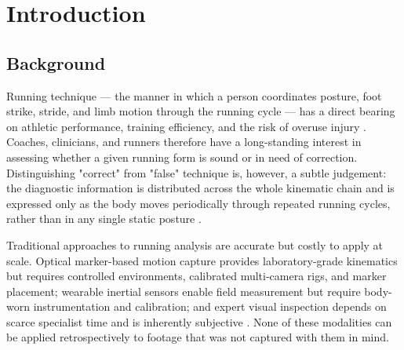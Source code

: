 %

\chapter{Introduction}
\label{ch:introduction}

\section{Background}
\label{sec:intro-background}

Running technique --- the manner in which a person coordinates posture, foot
strike, stride, and limb motion through the running cycle --- has a direct
bearing on athletic performance, training efficiency, and the risk of
overuse injury \cite{novacheck1998biomechanics}. Coaches, clinicians, and runners
therefore have a long-standing interest in assessing whether a given running
form is sound or in need of correction. Distinguishing "correct" from "false"
technique is, however, a subtle judgement: the diagnostic information is
distributed across the whole kinematic chain and is expressed only as the body
moves periodically through repeated running cycles, rather than in any single
static posture \cite{inostroza2025runningcycle, cutting1978gaitperiodicity}.

Traditional approaches to running analysis are accurate but costly to apply at
scale. Optical marker-based motion capture provides laboratory-grade kinematics
but requires controlled environments, calibrated multi-camera rigs, and marker
placement; wearable inertial sensors enable field measurement but require
body-worn instrumentation and calibration; and expert visual inspection depends
on scarce specialist time and is inherently subjective
\cite{panconi2024markerless, bulling2014tutorial}. None of these
modalities can be applied retrospectively to footage that was not captured with
them in mind.

